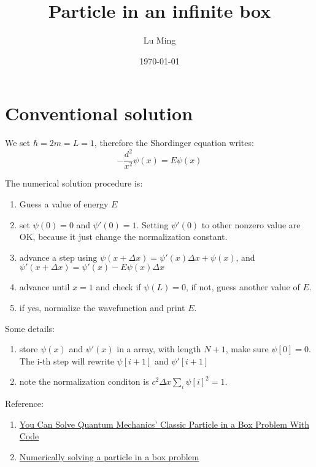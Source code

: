 \documentclass[a4paper]{article}
\title{Particle in an infinite box}
\author{Lu Ming}
\date{\today}
\begin{document}
\maketitle
\tableofcontents
\section{Conventional solution}
We set $\hbar=2m=L=1$, therefore the Shordinger equation writes:
\begin{equation}
-\frac{d^2}{x^2}\psi(x)=E\psi(x)
\end{equation}

The numerical solution procedure is:
\begin{enumerate}
\item
Guess a value of energy $E$
\item
set $\psi(0)=0$ and $\psi'(0)=1$. Setting $\psi'(0)$ to other nonzero value are OK, because it just change the normalization constant.
\item
advance a step using $\psi(x+\Delta x)=\psi'(x)\Delta x +\psi(x)$, and $\psi'(x+\Delta x)=\psi'(x)-E\psi(x)\Delta x$
\item
advance until $x=1$ and check if $\psi(L)=0$, if not, guess another value of $E$.
\item
if yes, normalize the wavefunction and print $E$.
\end{enumerate}
Some details:
\begin{enumerate}
\item 
store $\psi(x)$ and $\psi'(x)$ in a array, with length $N+1$, make sure $\psi[0]=0$. The i-th step will rewrite $\psi[i+1]$ and $\psi'[i+1]$
\item
note the normalization conditon is $c^2\Delta x\sum_i\psi[i]^2=1$.
\end{enumerate}

Reference:
\begin{enumerate}
\item
\href{http://www.wired.com/2016/03/can-solve-quantum-mechanics-classic-particle-box-problem-code/}{You Can Solve Quantum Mechanics’ Classic Particle in a Box Problem With Code}
\item
\href{http://physics.stackexchange.com/questions/275319/numerically-solving-a-particle-in-a-box-problem/275320#275320}{Numerically solving a particle in a box problem}
\end{enumerate}
\end{document}
